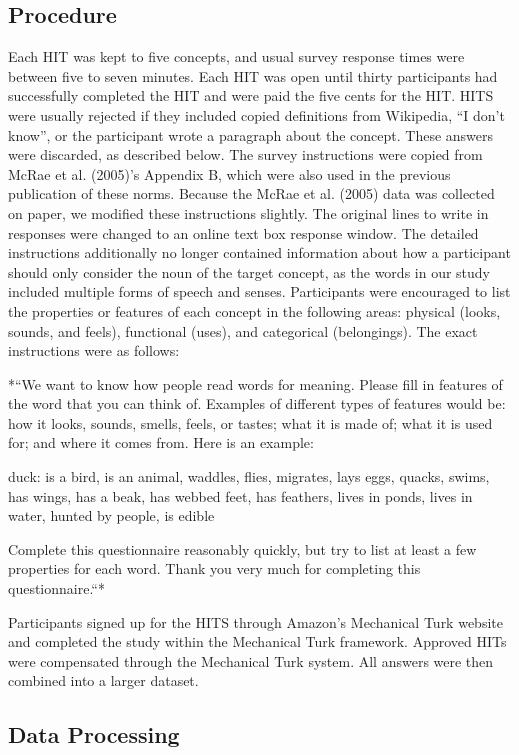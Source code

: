 \documentclass[english,,man]{apa6}
\theoremstyle{definition}
\theoremstyle{definition}
\theoremstyle{definition}
\theoremstyle{remark}
\begin{document}
\subsection{Procedure}\label{procedure}

Each HIT was kept to five concepts, and usual survey response times were
between five to seven minutes. Each HIT was open until thirty
participants had successfully completed the HIT and were paid the five
cents for the HIT. HITS were usually rejected if they included copied
definitions from Wikipedia, \enquote{I don't know}, or the participant
wrote a paragraph about the concept. These answers were discarded, as
described below. The survey instructions were copied from McRae et al.
(2005)'s Appendix B, which were also used in the previous publication of
these norms. Because the McRae et al. (2005) data was collected on
paper, we modified these instructions slightly. The original lines to
write in responses were changed to an online text box response window.
The detailed instructions additionally no longer contained information
about how a participant should only consider the noun of the target
concept, as the words in our study included multiple forms of speech and
senses. Participants were encouraged to list the properties or features
of each concept in the following areas: physical (looks, sounds, and
feels), functional (uses), and categorical (belongings). The exact
instructions were as follows:

*``We want to know how people read words for meaning. Please fill in
features of the word that you can think of. Examples of different types
of features would be: how it looks, sounds, smells, feels, or tastes;
what it is made of; what it is used for; and where it comes from. Here
is an example:

duck: is a bird, is an animal, waddles, flies, migrates, lays eggs,
quacks, swims, has wings, has a beak, has webbed feet, has feathers,
lives in ponds, lives in water, hunted by people, is edible

Complete this questionnaire reasonably quickly, but try to list at least
a few properties for each word. Thank you very much for completing this
questionnaire.``*

Participants signed up for the HITS through Amazon's Mechanical Turk
website and completed the study within the Mechanical Turk framework.
Approved HITs were compensated through the Mechanical Turk system. All
answers were then combined into a larger dataset.

\subsection{Data Processing}\label{data-processing}
\end{document}
